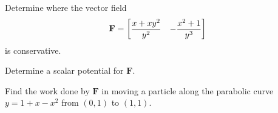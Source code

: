 \documentclass[boxes]{gsypset}
\begin{document}
	\begin{problem}[6.3.33]
		\begin{subproblems}
			\subproblem 
				Determine where the vector field
				\[
					\mathbf{F} = \begin{bmatrix}\dfrac{x + xy^2}{y^2} & -\dfrac{x^2 + 1}{y^3}\end{bmatrix}
				\]
				is conservative.
				\begin{solution}
					
				\end{solution}
			\subproblem Determine a scalar potential for $\mathbf{F}$.
				\begin{solution}
					
				\end{solution}
			\subproblem 
				Find the work done by $\mathbf{F}$ in moving a particle along the parabolic curve
				$y = 1 + x - x^2$ from $(0, 1)$ to $(1, 1)$.
				\begin{solution}
					
				\end{solution}
		\end{subproblems}
	\end{problem}
\end{document}
